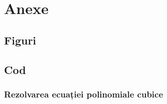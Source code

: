 \appendix

\chapter{Anexe}

\section{Figuri}

\clearpage


\section{Cod}

\subsection{Rezolvarea ecuației polinomiale cubice}



\clearpage